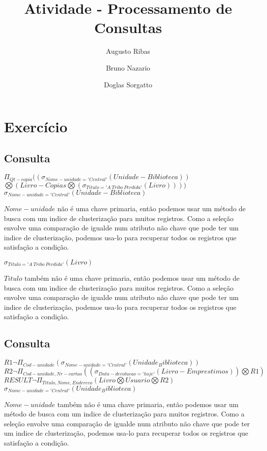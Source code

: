 \documentclass[a4paper,10pt]{article}
\title{Atividade - Processamento de Consultas}
\author{Augusto Ribas
\and
Bruno Nazario
\and
Doglas Sorgatto}
\begin{document}
\maketitle

\section{Exercício}

\subsection{Consulta}

$\Pi_{Qt-copia}((\sigma_{Nome-unidade='Central'}(Unidade-Biblioteca))$\\
$\bigotimes(Livro-Copias\bigotimes(\sigma_{Titulo='A\ Tribo\ Perdida'}(Livro))))$\\

$\sigma_{Nome-unidade='Central'}(Unidade-Biblioteca)$

$Nome-unidade$ não é uma chave primaria, então podemos usar um método de busca com um indice de clusterização para muitos registros. Como a seleção envolve uma comparação de igualde num atributo não chave que pode ter um indice de clusterização, podemos usa-lo para recuperar todos os registros que satisfação a condição.


$\sigma_{Titulo='A\ Tribo\ Perdida'}(Livro)$

$Titulo$ também não é uma chave primaria, então podemos usar um método de busca com um indice de clusterização para muitos registros. Como a seleção envolve uma comparação de igualde num atributo não chave que pode ter um indice de clusterização, podemos usa-lo para recuperar todos os registros que satisfação a condição.

\subsection{Consulta}
$R1 \neg \Pi_{Cod-unidade} (\sigma_{Nome-unidade='Central'}(Unidade_Biblioteca))$\\
$R2 \neg \Pi_{Cod-unidade,Nr-cartao} ((\sigma_{Data-devolucao='hoje'}(Livro-Emprestimos))\bigotimes R1 )$\\
$RESULT \neg \Pi_{Titulo,Nome,Endereco} (Livro \bigotimes Usuario \bigotimes R2)$\\


$\sigma_{Nome-unidade='Central'}(Unidade_Biblioteca)$

$Nome-unidade$ também não é uma chave primaria, então podemos usar um método de busca com um indice de clusterização para muitos registros. Como a seleção envolve uma comparação de igualde num atributo não chave que pode ter um indice de clusterização, podemos usa-lo para recuperar todos os registros que satisfação a condição.
\end{document}
